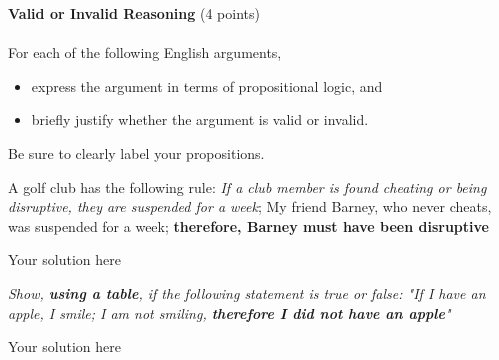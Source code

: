 \documentclass[12pt]{article}
\newenvironment{question}[2][Question]{\begin{trivlist}
\item[\hskip \labelsep {\bfseries #1}\hskip \labelsep {\bfseries #2.}]}{\end{trivlist}}
\newenvironment{solution}[1][Solution:]{\begin{trivlist}
\item[\hskip \labelsep {\bfseries #1}\hskip \labelsep {\bfseries}]\color{blue}}{\end{trivlist}}
\begin{document}
\begin{question}{1}\textbf{Valid or Invalid Reasoning} (4 points)\\\\
For each of the following English arguments, 
\begin{itemize}
    \item express the argument in terms of propositional logic, and
    \item briefly justify whether the argument is valid or invalid.
\end{itemize}
  Be sure to clearly label your propositions.
\begin{enumerate}[(a)]	

    \item A golf club has the following rule: \textit{ If a club member is found cheating or being disruptive, they are suspended for a week}; My friend Barney, who never cheats, was suspended for a week;  \textbf{therefore, Barney must have been disruptive}

    \begin{solution}
       Your solution here
    \end{solution}

    \item \textit{Show, \textbf{using a table}, if the following statement is true or false: "If I have an apple, I smile; I am not smiling, \textbf{therefore I did not have an apple}"}
    
    \begin{solution}
       Your solution here
    \end{solution}
    
\end{enumerate}
\end{question}




\clearpage

\end{document}

